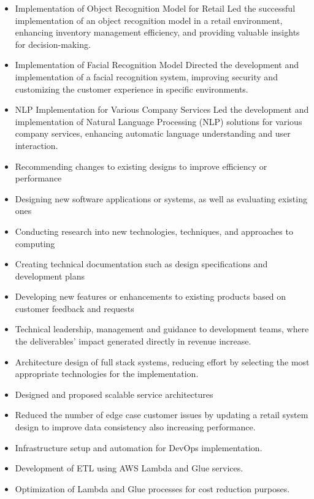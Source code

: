 
\begin{itemize}
  \item Implementation of Object Recognition Model for Retail
 Led the successful implementation of an object recognition model in a retail environment, enhancing inventory management efficiency, and providing valuable insights for decision-making.

  \item Implementation of Facial Recognition Model
 Directed the development and implementation of a facial recognition system, improving security and customizing the customer experience in specific environments.
  \item NLP Implementation for Various Company Services
 Led the development and implementation of Natural Language Processing (NLP) solutions for various company services, enhancing automatic language understanding and user interaction.
  \item Recommending changes to existing designs to improve efficiency or performance
  \item Designing new software applications or systems, as well as evaluating existing ones
  \item Conducting research into new technologies, techniques, and approaches to computing
  \item Creating technical documentation such as design specifications and development plans
  \item Developing new features or enhancements to existing products based on customer feedback and requests
  \item Technical leadership, management and guidance to development teams, where the deliverables’ impact generated directly in revenue increase.
  \item Architecture design of full stack systems, reducing effort by selecting the most appropriate technologies for the implementation.
  \item Designed and proposed scalable service architectures
  \item Reduced the number of edge case customer issues by updating a retail system design to improve data consistency also increasing performance.
  \item Infrastructure setup and automation for DevOps implementation.
  \item Development of ETL using AWS Lambda and Glue services.
  \item Optimization of Lambda and Glue processes for cost reduction purposes.
\end{itemize}

